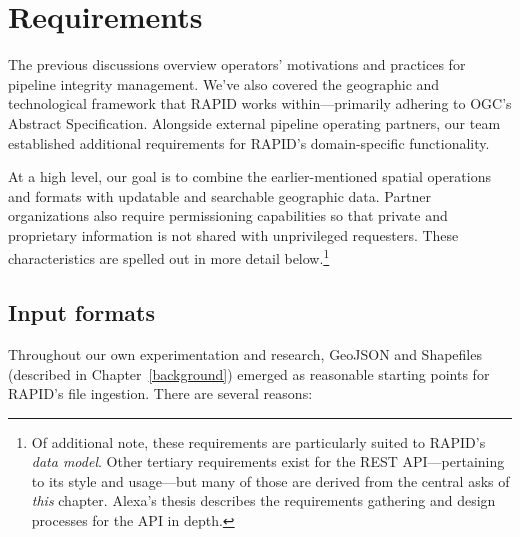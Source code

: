 \chapter{Requirements}
\label{requirements}

The previous discussions overview operators' motivations and practices for pipeline integrity management. We've also covered the geographic and technological framework that RAPID works within---primarily adhering to OGC's Abstract Specification. Alongside external pipeline operating partners, our team established additional requirements for RAPID's domain-specific functionality.

At a high level, our goal is to combine the earlier-mentioned spatial operations and formats with updatable and searchable  geographic data. Partner organizations also require permissioning capabilities so that private and proprietary information is not shared with unprivileged requesters. These characteristics are spelled out in more detail below.\footnote{Of additional note, these requirements are particularly suited to RAPID's \textit{data model}. Other tertiary requirements exist for the REST API---pertaining to its style and usage---but many of those are derived from the central asks of \textit{this} chapter. Alexa's thesis describes the requirements gathering and design processes for the API in depth.}

\section{Input formats}

Throughout our own experimentation and research, GeoJSON and Shapefiles (described in Chapter~\ref{background}) emerged as reasonable starting points for RAPID's file ingestion. There are several reasons:

